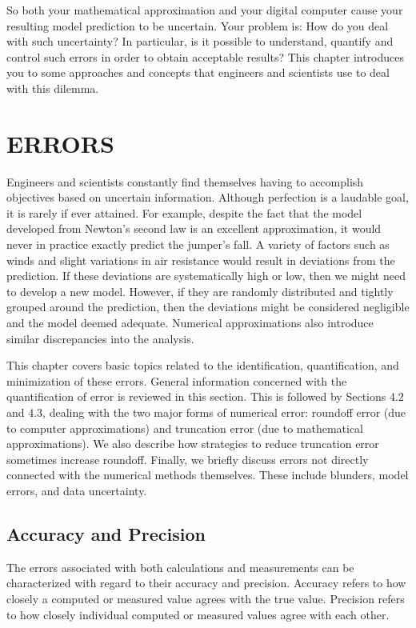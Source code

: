 \documentclass[../main.tex]{subfiles}
\begin{document}
So both your mathematical approximation and your digital computer cause your resulting
model prediction to be uncertain. Your problem is: How do you deal with such uncertainty?
In particular, is it possible to understand, quantify and control such errors in
order to obtain acceptable results? This chapter introduces you to some approaches and
concepts that engineers and scientists use to deal with this dilemma.

\bigskip
\section[ERRORS]{ERRORS}

Engineers and scientists constantly find themselves having to accomplish objectives based
on uncertain information. Although perfection is a laudable goal, it is rarely if ever attained.
For example, despite the fact that the model developed from Newton's second law
is an excellent approximation, it would never in practice exactly predict the jumper's fall.
A variety of factors such as winds and slight variations in air resistance would result in deviations
from the prediction. If these deviations are systematically high or low, then we
might need to develop a new model. However, if they are randomly distributed and tightly
grouped around the prediction, then the deviations might be considered negligible and the
model deemed adequate. Numerical approximations also introduce similar discrepancies
into the analysis.

This chapter covers basic topics related to the identification, quantification, and minimization
of these errors. General information concerned with the quantification of error is
reviewed in this section. This is followed by Sections 4.2 and 4.3, dealing with the two
major forms of numerical error: roundoff error (due to computer approximations) and truncation
error (due to mathematical approximations). We also describe how strategies to reduce
truncation error sometimes increase roundoff. Finally, we briefly discuss errors not
directly connected with the numerical methods themselves. These include blunders, model
errors, and data uncertainty.

\subsection{Accuracy and Precision}
\noindent
The errors associated with both calculations and measurements can be characterized with
regard to their accuracy and precision. Accuracy refers to how closely a computed or measured
value agrees with the true value. Precision refers to how closely individual computed
or measured values agree with each other.
\end{document}
